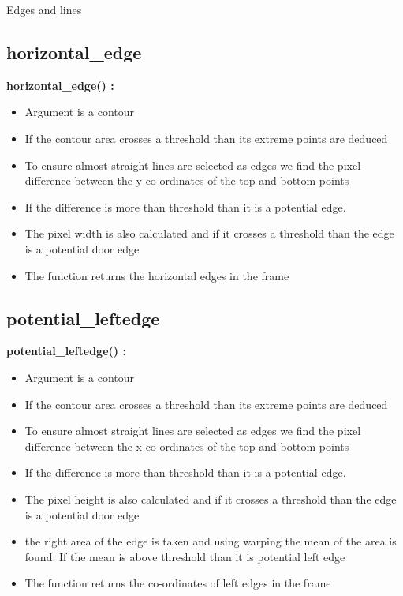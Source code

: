 \documentclass[10pt, a4paper]{beamer}
\begin{document}
\begin{frame}[allowframebreaks]{Edges and lines}
  \subsection{horizontal\_edge}
    \textbf{horizontal\_edge() : }
      \begin{itemize}
       \item Argument is a contour
       \item If the contour area crosses a threshold than its extreme points are deduced
       \item To ensure almost straight lines are selected as edges we find the pixel difference between the y co-ordinates of the top and bottom points
       \item If the difference is more than threshold than it is a potential edge. 
       \item The pixel width is also calculated and if it crosses a threshold than the edge is a potential door edge
       \item The function returns the horizontal edges in the frame
      \end{itemize}
\framebreak
  \subsection{potential\_leftedge}
    \textbf{potential\_leftedge() : }
      \begin{itemize}
       \item Argument is a contour
       \item If the contour area crosses a threshold than its extreme points are deduced
       \item To ensure almost straight lines are selected as edges we find the pixel difference between the x co-ordinates of the top and bottom points
       \item If the difference is more than threshold than it is a potential edge. 
       \item The pixel height is also calculated and if it crosses a threshold than the edge is a potential door edge
       \item the right area of the edge is taken and using warping the mean of the area is found. If the mean is above threshold than it is potential left edge
       \item The function returns the co-ordinates of left edges in the frame
      \end{itemize}
\framebreak

\end{frame}
\end{document}
